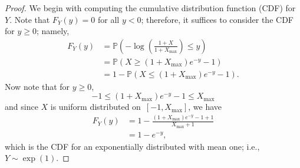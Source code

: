 \documentclass[letterpaper, 10 pt, journal, twoside]{IEEEtran}  %
\begin{document}
\begin{proof}
    We begin with computing the cumulative distribution function (CDF) for $Y$. Note that $F_Y(y) = 0$ for all $y < 0$; therefore, it suffices to consider the CDF for $y \ge 0 $; namely,
\begin{align*}
	F_Y(y)
	&= \mathbb{P} \left(  - \log \left( {\frac{{1 + X}}{1 + X_{\max } }} \right) \le y \right) 
	\\ 
	&= \mathbb{P}\left( {X \ge \left( {1 + {X_{\max }}} \right){e^{ - y}} - 1} \right)
	\\ 
	&= 1 - \mathbb{P}\left( {X \le \left( {1 + {X_{\max }}} \right){e^{ - y}} - 1} \right).
\end{align*}
Now note that for $y \ge 0$, 
$$ - 1 \le \left( {1 + {X_{\max }}} \right){e^{ - y}} - 1 \le {X_{\max }}$$ 
and since $X $ is uniform distributed on~$[-1, X_{\max}]$, we have
\begin{align*}
    F_Y(y)
    & = 1 - \frac{{\left( 1 + X_{\max} \right){e^{ - y}} - 1 + 1}}{X_{\max } + 1}\\
    &= 1 - e^{ - y},
\end{align*}
which is the CDF for an exponentially distributed with mean one; i.e., $Y \sim \exp(1).$
\end{proof}   
\end{document}
